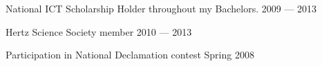  National ICT Scholarship Holder throughout my Bachelors.	\hfill 2009 --- 2013
 
Hertz Science Society member \hfill 2010 --- 2013

Participation in National Declamation contest	\hfill Spring 2008


